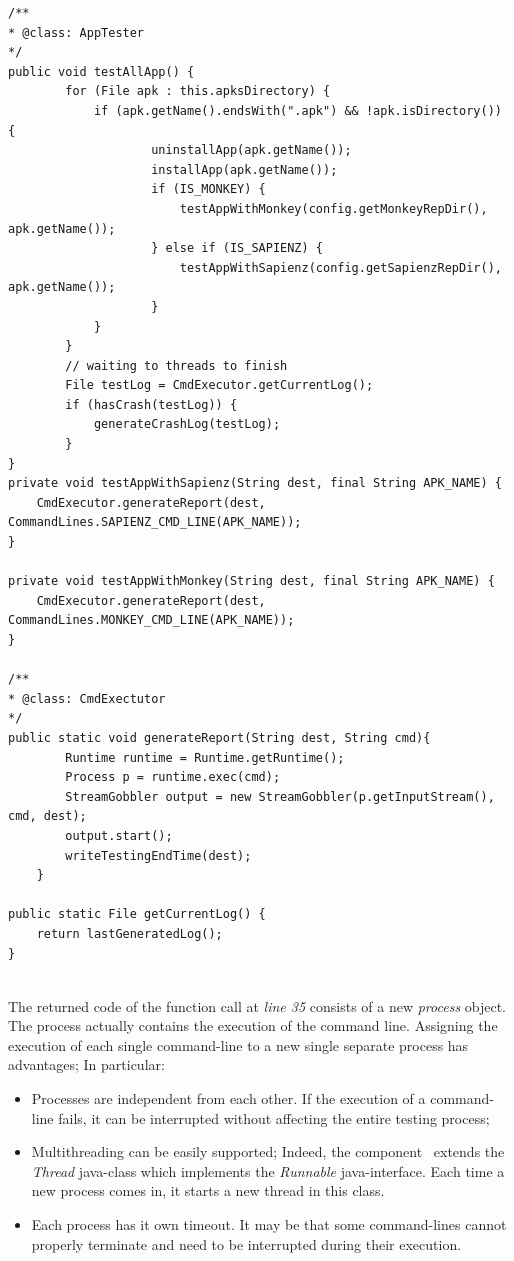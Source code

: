 \clearpage
\begin{lstlisting}[caption=Testing mechanism between \AppTester\ and \Cmd\, ,label={lst:apptester}]
/**
* @class: AppTester
*/
public void testAllApp() {
        for (File apk : this.apksDirectory) {
            if (apk.getName().endsWith(".apk") && !apk.isDirectory()) {
                    uninstallApp(apk.getName());
                    installApp(apk.getName());
                    if (IS_MONKEY) {
                        testAppWithMonkey(config.getMonkeyRepDir(), apk.getName());
                    } else if (IS_SAPIENZ) {
                        testAppWithSapienz(config.getSapienzRepDir(), apk.getName());
                    }
            }
        } 
        // waiting to threads to finish 
        File testLog = CmdExecutor.getCurrentLog();
        if (hasCrash(testLog)) {
            generateCrashLog(testLog);
        }
} 
private void testAppWithSapienz(String dest, final String APK_NAME) {
	CmdExecutor.generateReport(dest, CommandLines.SAPIENZ_CMD_LINE(APK_NAME)); 
}

private void testAppWithMonkey(String dest, final String APK_NAME) {
	CmdExecutor.generateReport(dest, CommandLines.MONKEY_CMD_LINE(APK_NAME)); 
}

/**
* @class: CmdExectutor
*/
public static void generateReport(String dest, String cmd){
        Runtime runtime = Runtime.getRuntime();
        Process p = runtime.exec(cmd);
        StreamGobbler output = new StreamGobbler(p.getInputStream(), cmd, dest); 
        output.start();
        writeTestingEndTime(dest);
    }
    
public static File getCurrentLog() {
    return lastGeneratedLog();
}
    
\end{lstlisting}
\clearpage 

\hspace{-1.5em}The returned code of the function call at \textit{line 35} consists of a new \textit{process} object. 
The process actually contains the execution of the command line. 
Assigning the execution of each single command-line to a new single separate process has advantages; In particular: 
\begin{itemize}
\item Processes are independent from each other. 
If the execution of a command-line fails, it can be interrupted without affecting the entire testing process; 
\item Multithreading can be easily supported; Indeed, the component \Stream\ extends the \textit{Thread} java-class which implements the \textit{Runnable} java-interface. Each time a new process comes in, it starts a new thread in this class.
\item Each process has it own timeout. It may be that some command-lines cannot properly terminate and need to be interrupted during their execution.  
\end{itemize}
